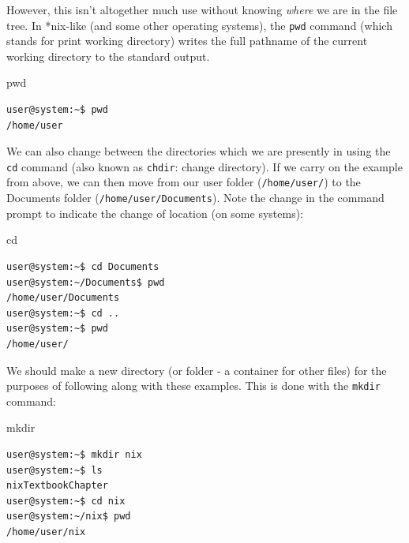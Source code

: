 \documentclass[11pt]{article}
\begin{document}
However, this isn't altogether much use without knowing \emph{where} we are in the file tree. In *nix-like (and some other operating systems), the \texttt{pwd} command (which stands for print working directory) writes the full pathname of the current working directory to the standard output.\\

\begin{listing}[H]
\caption{pwd}\vspace{-0.1in}
\begin{verbatim}
user@system:~$ pwd
/home/user
\end{verbatim}
\end{listing}

We can also change between the directories which we are presently in using the \texttt{cd} command (also known as \texttt{chdir}: change directory). If we carry on the example from above, we can then move from our user folder (\texttt{/home/user/}) to the Documents folder (\texttt{/home/user/Documents}). Note the change in the command prompt to indicate the change of location (on some systems):\\

\begin{listing}[H]
\caption{cd}\vspace{-0.1in}
\begin{verbatim}
user@system:~$ cd Documents
user@system:~/Documents$ pwd
/home/user/Documents
user@system:~$ cd ..
user@system:~$ pwd
/home/user/
\end{verbatim}
\end{listing}

We should make a new directory (or folder - a container for other files) for the purposes of following along with these examples. This is done with the \texttt{mkdir} command:\\

\begin{listing}[H]
\caption{mkdir}\vspace{-0.1in}
\begin{verbatim}
user@system:~$ mkdir nix
user@system:~$ ls
nixTextbookChapter
user@system:~$ cd nix
user@system:~/nix$ pwd
/home/user/nix
\end{verbatim}
\end{listing}
\end{document}
